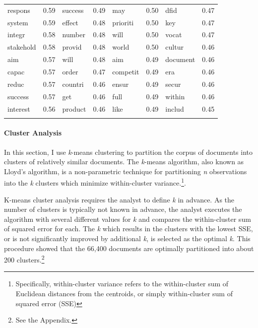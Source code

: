 \documentclass[11pt,article,oneside]{memoir}
\begin{document}
\begin{longtable}[c]{@{}lrlrlrlr@{}}
\\\addlinespace
respons & 0.59 & success & 0.49 & may & 0.50 & dfid & 0.47
\\\addlinespace
system & 0.59 & effect & 0.48 & prioriti & 0.50 & key & 0.47
\\\addlinespace
integr & 0.58 & number & 0.48 & will & 0.50 & vocat & 0.47
\\\addlinespace
stakehold & 0.58 & provid & 0.48 & world & 0.50 & cultur & 0.46
\\\addlinespace
aim & 0.57 & will & 0.48 & aim & 0.49 & document & 0.46
\\\addlinespace
capac & 0.57 & order & 0.47 & competit & 0.49 & era & 0.46
\\\addlinespace
reduc & 0.57 & countri & 0.46 & ensur & 0.49 & secur & 0.46
\\\addlinespace
success & 0.57 & get & 0.46 & full & 0.49 & within & 0.46
\\\addlinespace
interest & 0.56 & product & 0.46 & like & 0.49 & includ & 0.45
\\\addlinespace
\bottomrule
\end{longtable}

\pagebreak

\paragraph{Cluster Analysis}\label{cluster-analysis}

In this section, I use \emph{k}-means clustering to partition the corpus
of documents into clusters of relatively similar documents. The
\emph{k}-means algorithm, also known as Lloyd's algorithm, is a
non-parametric technique for partitioning \emph{n} observations into the
\emph{k} clusters which minimize within-cluster variance.\footnote{Specifically,
  within-cluster variance refers to the within-cluster sum of Euclidean
  distances from the centroids, or simply within-cluster sum of squared
  error (SSE)}.

K-means cluster analysis requires the analyst to define \emph{k} in
advance. As the number of clusters is typically not known in advance,
the analyst executes the algorithm with several different values for
\emph{k} and compares the within-cluster sum of squared error for each.
The \emph{k} which results in the clusters with the lowest SSE, or is
not significantly improved by additional \emph{k}, is selected as the
optimal \emph{k}. This procedure showed that the 66,400 documents are
optimally partitioned into about 200 clusters.\footnote{See the
  Appendix.}
\end{document}
